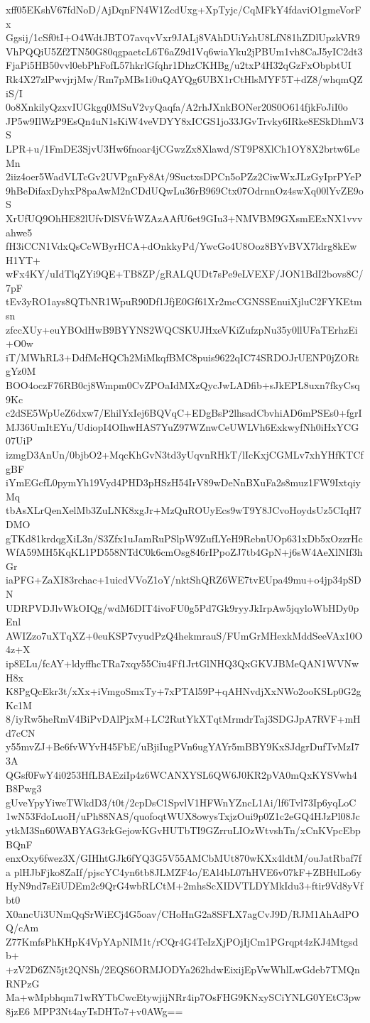 xff05EKshV67fdNoD/AjDqnFN4W1ZcdUxg+XpTyjc/CqMFkY4fdaviO1gmeVorFx
Ggsij/1cSf0tI+O4WdtJBTO7avqvVxr9JALj8VAhDUiYzhU8LfN81hZDlUpzkVR9
VhPQQiU5Zf2TN50G80qgpaetcL6T6aZ9d1Vq6wiaYku2jPBUm1vh8CaJ5yIC2dt3
FjaPi5HB50vvl0ebPhFofL57hkrlGfqhr1DhzCKHBg/u2txP4H32qGzFxObpbtUI
Rk4X27zlPwvjrjMw/Rm7pMBs1i0uQAYQg6UBX1rCtHlsMYF5T+dZ8/whqmQZiS/I
0o8XnkilyQzxvIUGkgq0MSuV2vyQaqfa/A2rhJXnkBONer20S0O614fjkFoJiI0o
JP5w9IlWzP9EsQn4uN1sKiW4veVDYY8xICGS1jo33JGvTrvky6IRke8ESkDhmV3S
LPR+u/1FmDE3SjvU3Hw6fnoar4jCGwzZx8Xlawd/ST9P8XlCh1OY8X2brtw6LeMn
2iiz4oer5WadVLTcGv2UVPgnFy8At/9SuctxsDPCn5oPZz2CiwWxJLzGyIprPYeP
9hBeDifaxDyhxP8paAwM2nCDdUQwLu36rB969Ctx07OdrnnOz4swXq00lYvZE9oS
XrUfUQ9OhHE82lUfvDlSVfrWZAzAAfU6et9GIu3+NMVBM9GXsmEExNX1vvvahwe5
fH3iCCN1VdxQsCcWByrHCA+dOnkkyPd/YwcGo4U8Ooz8BYvBVX7ldrg8kEwH1YT+
wFx4KY/uIdTlqZYi9QE+TB8ZP/gRALQUDt7sPe9eLVEXF/JON1BdI2bovs8C/7pF
tEv3yRO1ays8QTbNR1WpuR90Df1JfjE0Gf61Xr2mcCGNSSEnuiXjluC2FYKEtmsn
zfccXUy+euYBOdHwB9BYYNS2WQCSKUJHxeVKiZufzpNu35y0llUFaTErhzEi+O0w
iT/MWhRL3+DdfMcHQCh2MiMkqfBMC8puis9622qIC74SRDOJrUENP0jZORtgYz0M
BOO4oczF76RB0cj8Wmpm0CvZPOaIdMXzQycJwLADfib+sJkEPL8uxn7fkyCsq9Kc
c2dSE5WpUeZ6dxw7/EhilYxIej6BQVqC+EDgBsP2lhsadCbvhiAD6mPSEs0+fgrI
MJ36UmItEYu/UdiopI4OIhwHAS7YuZ97WZnwCeUWLVh6ExkwyfNh0iHxYCG07UiP
izmgD3AnUn/0bjbO2+MqcKhGvN3td3yUqvnRHkT/lIcKxjCGMLv7xhYHfKTCfgBF
iYmEGcfL0pymYh19Vyd4PHD3pHSzH54IrV89wDeNnBXuFa2s8muz1FW9IxtqiyMq
tbAsXLrQenXelMb3ZuLNK8xgJr+MzQuROUyEcs9wT9Y8JCvoHoydsUz5CIqH7DMO
gTKd81krdqgXiL3n/S3Zfx1uJamRuPSlpW9ZufLYeH9RebnUOp631xDb5xOzzrHc
WfA59MH5KqKL1PD558NTdC0k6cmOsg846rIPpoZJ7tb4GpN+j6sW4AeXlNIf3hGr
iaPFG+ZaXI83rchac+1uicdVVoZ1oY/nktShQRZ6WE7tvEUpa49mu+o4jp34pSDN
UDRPVDJlvWkOIQg/wdM6DIT4ivoFU0g5Pd7Gk9ryyJkIrpAw5jqyloWbHDy0pEnl
AWIZzo7uXTqXZ+0euKSP7vyudPzQ4hekmrauS/FUmGrMHexkMddSeeVAx10O4z+X
ip8ELu/fcAY+ldyffhcTRa7xqy55Ciu4Ff1JrtGlNHQ3QxGKVJBMeQAN1WVNwH8x
K8PgQcEkr3t/xXx+iVmgoSmxTy+7xPTAl59P+qAHNvdjXxNWo2ooKSLp0G2gKc1M
8/iyRw5heRmV4BiPvDAlPjxM+LC2RutYkXTqtMrmdrTaj3SDGJpA7RVF+mHd7cCN
y55mvZJ+Be6fvWYvH45FbE/uBjiIugPVn6ugYAYr5mBBY9KxSJdgrDufTvMzI73A
QGsf0FwY4i0253HfLBAEziIp4z6WCANXYSL6QW6J0KR2pVA0mQxKYSVwh4B8Pwg3
gUveYpyYiweTWkdD3/t0t/2cpDsC1SpvlV1HFWnYZncL1Ai/lf6Tvl73Ip6yqLoC
1wN53FdoLuoH/uPh88NAS/quofoqtWUX8owysTxjzOui9p0Z1c2eGQ4HJzPl08Jc
ytkM3Sn60WABYAG3rkGejowKGvHUTbTI9GZrruLIOzWtvshTn/xCnKVpcEbpBQnF
enxOxy6fwez3X/GIHhtGJk6fYQ3G5V55AMCbMUt870wKXx4ldtM/ouJatRbaf7fa
plHJbFjko8ZaIf/pjscYC4yn6tb8JLMZF4o/EAl4bL07hHVE6v07kF+ZBHtlLo6y
HyN9nd7sEiUDEm2c9QrG4wbRLCtM+2mhsScXIDVTLDYMkIdu3+ftir9Vd8yVfbt0
X0ancUi3UNmQqSrWiECj4G5oav/CHoHnG2a8SFLX7agCvJ9D/RJM1AhAdPOQ/cAm
Z77KmfsPhKHpK4VpYApNIM1t/rCQr4G4TeIzXjPOjIjCm1PGrqpt4zKJ4Mtgsdb+
+zV2D6ZN5jt2QNSh/2EQS6ORMJODYa262hdwEixijEpVwWhlLwGdeb7TMQnRNPzG
Ma+wMpbhqm71wRYTbCwcEtywjijNRr4ip7OsFHG9KNxySCiYNLG0YEtC3pw8jzE6
MPP3Nt4ayTsDHTo7+v0AWg==
